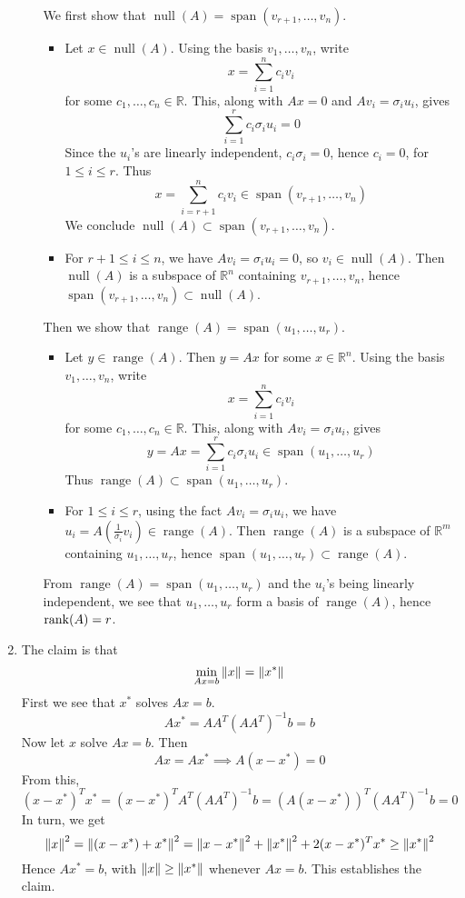 \documentclass{article}
\def\mbb#1{\mathbb{#1}}
\def\bR{\mbb{R}}
\newcommand{\br}[1]{\left(#1\right)}
\DeclareMathOperator{\Span}{span}
\DeclareMathOperator{\Null}{null}
\DeclareMathOperator{\range}{range}
\newcommand{\s}{\sigma}
\renewcommand{\ss}{\subset}
\newcommand{\inv}{^{-1}}
\newcommand{\imp}{\implies}
\begin{document}
\begin{enumerate}
\begin{enumerate}
		We first show that $\Null(A)=\Span(v_{r+1},\dots,v_n)$.
		\begin{itemize}
			\item Let $x\in\Null(A)$. Using the basis $v_1,\dots,v_n$, write
			\[x=\sum_{i=1}^nc_iv_i\]
			for some $c_1,\dots,c_n\in\bR$. This, along with $Ax=0$ and $Av_i=\s_iu_i$, gives
			\[\sum_{i=1}^r c_i\s_iu_i=0\]
			Since the $u_i$'s are linearly independent, $c_i\s_i=0$, hence $c_i=0$, for $1\le i\le r$. Thus
			\[x=\sum_{i=r+1}^n c_iv_i\in\Span(v_{r+1},\dots,v_n)\] 
			We conclude $\Null(A)\ss\Span(v_{r+1},\dots,v_n)$.
			\item For $r+1\le i\le n$, we have $Av_i=\s_iu_i=0$, so $v_i\in\Null(A)$. Then $\Null(A)$ is a subspace of $\bR^n$ containing $v_{r+1},\dots,v_n$, hence $\Span(v_{r+1},\dots,v_n)\ss\Null(A)$.
		\end{itemize}
	
		Then we show that $\range(A)=\Span(u_1,\dots,u_r)$.
		\begin{itemize}
			\item Let $y\in\range(A)$. Then $y=Ax$ for some $x\in\bR^n$. Using the basis $v_1,\dots,v_n$, write
			\[x=\sum_{i=1}^nc_iv_i\]
			for some $c_1,\dots,c_n\in\bR$. This, along with $Av_i=\s_iu_i$, gives
			\[y=Ax=\sum_{i=1}^r c_i\s_iu_i\in\Span(u_1,\dots,u_r)\]
			Thus $\range(A)\ss\Span(u_1,\dots,u_r)$.
			\item For $1\le i\le r$, using the fact $Av_i=\s_iu_i$, we have $u_i=A\br{\frac{1}{\s_i}v_i}\in\range(A)$. Then $\range(A)$ is a subspace of $\bR^m$ containing $u_1,\dots,u_r$, hence $\Span(u_1,\dots,u_r)\ss\range(A)$.
		\end{itemize}
	
		From $\range(A)=\Span(u_1,\dots,u_r)$ and the $u_i$'s being linearly independent, we see that $u_1,\dots,u_r$ form a basis of $\range(A)$, hence $\rank(A)=r$.
		
		
		
		
	\end{enumerate}

	
	
	\pagebreak
	
	

	\item The claim is that
	\[\min_{Ax=b}\norm{x}=\norm{x^*}\]
	First we see that $x^*$ solves $Ax=b$.
	\[Ax^* = AA^T(AA^T)\inv b = b\]
	Now let $x$ solve $Ax=b$. Then
	\[Ax = Ax^*
	\imp A(x-x^*) = 0\]
	From this,
	\[(x-x^*)^Tx^* = (x-x^*)^TA^T(AA^T)\inv b
	= (A(x-x^*))^T(AA^T)\inv b
	= 0\]
	In turn, we get
	\[\norm{x}^2 = \norm{(x-x^*)+x^*}^2
	= \norm{x-x^*}^2 + \norm{x^*}^2 + 2(x-x^*)^Tx^*
	\ge \norm{x^*}^2\]
	Hence $Ax^*=b$, with $\norm{x}\ge\norm{x^*}$ whenever $Ax=b$. This establishes the claim.
	

\end{enumerate}
\end{document}

